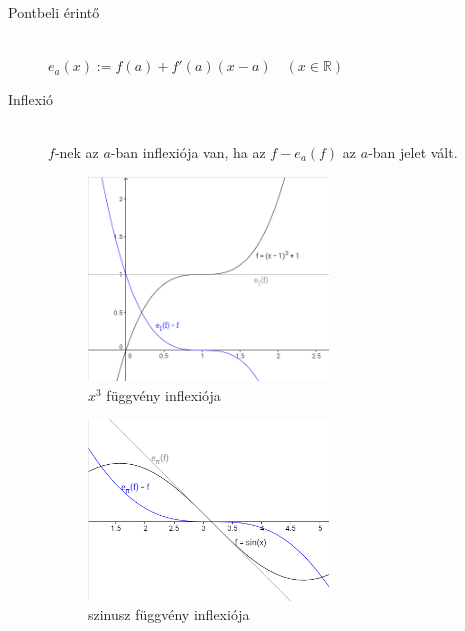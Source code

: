 \documentclass[margin=0px]{article}
\newcommand{\R}{\mathbb{R}}
\begin{document}
\begin{description}
\begin{description}
            \item[Pontbeli érintő] \hfill \\
                $ e_a(x) := f(a) + f'(a)(x-a) \quad (x\in\R)$
            \item[Inflexió] \hfill \\
                $ f$-nek az $a$-ban inflexiója van, ha az $f - e_a(f) $ az $a$-ban jelet vált.
        \end{description}
        \begin{figure}[H]
            \begin{subfigure}{.33\textwidth}
                \centering
                \includegraphics[width=0.7\textwidth]{img/inflexio_x3.png}
                \caption{$x^3$ függvény inflexiója}
            \end{subfigure}
            \begin{subfigure}{.33\textwidth}
                \centering
                \includegraphics[width=0.7\textwidth]{img/inflexio_sin.png}
                \caption{szinusz függvény inflexiója}
            \end{subfigure}
            \begin{subfigure}{.33\textwidth}

\end{subfigure}
\end{figure}
\end{description}
\end{document}
